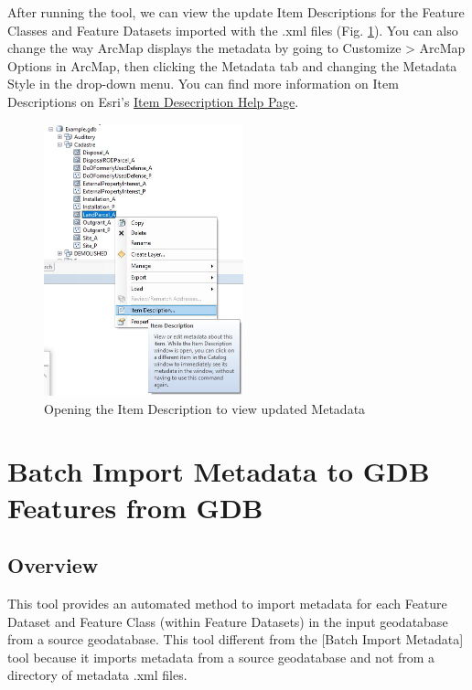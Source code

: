 \documentclass[openany]{book}
\theoremstyle{definition}
\theoremstyle{definition}
\theoremstyle{definition}
\theoremstyle{remark}
\begin{document}
After running the tool, we can view the update Item Descriptions for the
Feature Classes and Feature Datasets imported with the .xml files (Fig.
\ref{fig:imMetaafter}). You can also change the way ArcMap displays the
metadata by going to Customize \textgreater{} ArcMap Options in ArcMap,
then clicking the Metadata tab and changing the Metadata Style in the
drop-down menu. You can find more information on Item Descriptions on
Esri's
\href{http://desktop.arcgis.com/en/arcmap/latest/map/working-with-arcmap/documenting-items-in-the-catalog-window.htm}{Item
Desecription Help Page}.

\begin{figure}[H]

{\centering \includegraphics[width=2.27in,]{figures/imMeta-after} 

}

\caption{Opening the Item Description to view updated Metadata}\label{fig:imMetaafter}
\end{figure}

\chapter{Batch Import Metadata to GDB Features from
GDB}\label{imMetaGDB}

\section{Overview}\label{overview-13}

This tool provides an automated method to import metadata for each
Feature Dataset and Feature Class (within Feature Datasets) in the input
geodatabase from a source geodatabase. This tool different from the
{[}Batch Import Metadata{]} tool because it imports metadata from a
source geodatabase and not from a directory of metadata .xml files.
\end{document}
